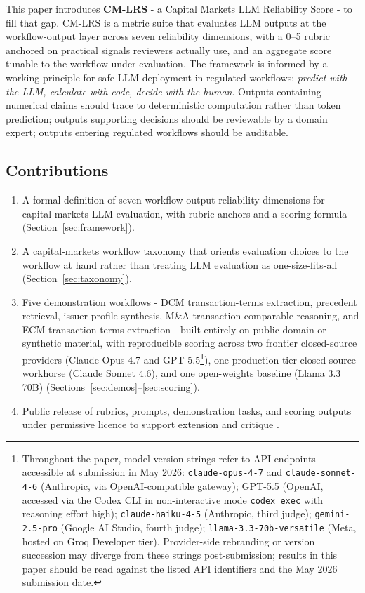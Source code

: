 \documentclass[11pt]{article}
\begin{document}
This paper introduces \textbf{CM-LRS} - a Capital Markets LLM Reliability Score - to fill that gap. CM-LRS is a metric suite that evaluates LLM outputs at the workflow-output layer across seven reliability dimensions, with a 0--5 rubric anchored on practical signals reviewers actually use, and an aggregate score tunable to the workflow under evaluation. The framework is informed by a working principle for safe LLM deployment in regulated workflows: \emph{predict with the LLM, calculate with code, decide with the human}. Outputs containing numerical claims should trace to deterministic computation rather than token prediction; outputs supporting decisions should be reviewable by a domain expert; outputs entering regulated workflows should be auditable.

\subsection*{Contributions}

\begin{enumerate}[leftmargin=*,itemsep=0.2em]
\item A formal definition of seven workflow-output reliability dimensions for capital-markets LLM evaluation, with rubric anchors and a scoring formula (Section~\ref{sec:framework}).
\item A capital-markets workflow taxonomy that orients evaluation choices to the workflow at hand rather than treating LLM evaluation as one-size-fits-all (Section~\ref{sec:taxonomy}).
\item Five demonstration workflows - DCM transaction-terms extraction, precedent retrieval, issuer profile synthesis, M\&A transaction-comparable reasoning, and ECM transaction-terms extraction - built entirely on public-domain or synthetic material, with reproducible scoring across two frontier closed-source providers (Claude Opus 4.7 and GPT-5.5\footnote{Throughout the paper, model version strings refer to API endpoints accessible at submission in May 2026: \texttt{claude-opus-4-7} and \texttt{claude-sonnet-4-6} (Anthropic, via OpenAI-compatible gateway); GPT-5.5 (OpenAI, accessed via the Codex CLI in non-interactive mode \texttt{codex exec} with reasoning effort high); \texttt{claude-haiku-4-5} (Anthropic, third judge); \texttt{gemini-2.5-pro} (Google AI Studio, fourth judge); \texttt{llama-3.3-70b-versatile} (Meta, hosted on Groq Developer tier). Provider-side rebranding or version succession may diverge from these strings post-submission; results in this paper should be read against the listed API identifiers and the May 2026 submission date.}), one production-tier closed-source workhorse (Claude Sonnet 4.6), and one open-weights baseline (Llama 3.3 70B) (Sections~\ref{sec:demos}--\ref{sec:scoring}).
\item Public release of rubrics, prompts, demonstration tasks, and scoring outputs under permissive licence to support extension and critique \citep{cmlrs2026repo}.
\end{enumerate}
\end{document}
